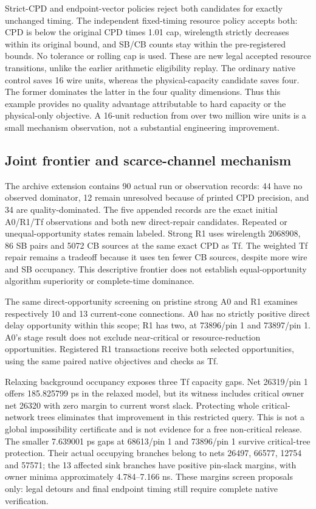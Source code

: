 Strict-CPD and endpoint-vector policies reject both candidates for exactly unchanged timing. The independent fixed-timing resource policy accepts both: CPD is below the original CPD times 1.01 cap, wirelength strictly decreases within its original bound, and SB/CB counts stay within the pre-registered bounds. No tolerance or rolling cap is used. These are new legal accepted resource transitions, unlike the earlier arithmetic eligibility replay. The ordinary native control saves 16 wire units, whereas the physical-capacity candidate saves four. The former dominates the latter in the four quality dimensions. Thus this example provides no quality advantage attributable to hard capacity or the physical-only objective. A 16-unit reduction from over two million wire units is a small mechanism observation, not a substantial engineering improvement.

\subsection{Joint frontier and scarce-channel mechanism}
The archive extension contains 90 actual run or observation records: 44 have no observed dominator, 12 remain unresolved because of printed CPD precision, and 34 are quality-dominated. The five appended records are the exact initial A0/R1/Tf observations and both new direct-repair candidates. Repeated or unequal-opportunity states remain labeled. Strong R1 uses wirelength 2068908, 86 SB pairs and 5072 CB sources at the same exact CPD as Tf. The weighted Tf repair remains a tradeoff because it uses ten fewer CB sources, despite more wire and SB occupancy. This descriptive frontier does not establish equal-opportunity algorithm superiority or complete-time dominance.

The same direct-opportunity screening on pristine strong A0 and R1 examines respectively 10 and 13 current-cone connections. A0 has no strictly positive direct delay opportunity within this scope; R1 has two, at 73896/pin 1 and 73897/pin 1. A0's stage result does not exclude near-critical or resource-reduction opportunities. Registered R1 transactions receive both selected opportunities, using the same paired native objectives and checks as Tf.

Relaxing background occupancy exposes three Tf capacity gaps. Net 26319/pin 1 offers 185.825799 ps in the relaxed model, but its witness includes critical owner net 26320 with zero margin to current worst slack. Protecting whole critical-network trees eliminates that improvement in this restricted query. This is not a global impossibility certificate and is not evidence for a free non-critical release. The smaller 7.639001 ps gaps at 68613/pin 1 and 73896/pin 1 survive critical-tree protection. Their actual occupying branches belong to nets 26497, 66577, 12754 and 57571; the 13 affected sink branches have positive pin-slack margins, with owner minima approximately 4.784--7.166 ns. These margins screen proposals only: legal detours and final endpoint timing still require complete native verification.

